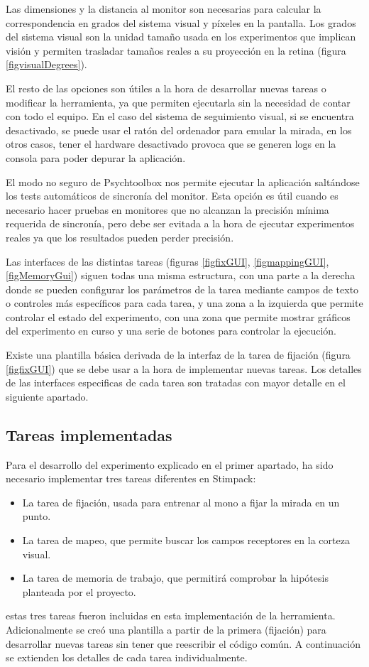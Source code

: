 \documentclass[conference]{IEEEtran}
\begin{document}
Las dimensiones y la distancia al monitor son necesarias para calcular la correspondencia en grados del sistema visual y píxeles en la pantalla. Los grados del sistema visual son la unidad tamaño usada en los experimentos que implican visión y permiten trasladar tamaños reales a su proyección en la retina (figura \ref{figvisualDegrees}).

El resto de las opciones son útiles a la hora de desarrollar nuevas tareas o modificar la herramienta, ya que permiten ejecutarla sin la necesidad de contar con todo el equipo. En el caso del sistema de seguimiento visual, si se encuentra desactivado, se puede usar el ratón del ordenador para emular la mirada, en los otros casos, tener el hardware desactivado provoca que se generen logs en la consola para poder depurar la aplicación.

El modo no seguro de Psychtoolbox nos permite ejecutar la aplicación saltándose los tests automáticos de sincronía del monitor. Esta opción es útil cuando es necesario hacer pruebas en monitores que no alcanzan la precisión mínima requerida de sincronía, pero debe ser evitada a la hora de ejecutar experimentos reales ya que los resultados pueden perder precisión.

Las interfaces de las distintas tareas (figuras \ref{figfixGUI}, \ref{figmappingGUI}, \ref{figMemoryGui}) siguen todas una misma estructura, con una parte a la derecha donde se pueden configurar los parámetros de la tarea mediante campos de texto o controles más específicos para cada tarea, y una zona a la izquierda que permite controlar el estado del experimento, con una zona que permite mostrar gráficos del experimento en curso y una serie de botones para controlar la ejecución.

Existe una plantilla básica derivada de la interfaz de la tarea de fijación (figura \ref{figfixGUI}) que se debe usar a la hora de implementar nuevas tareas.
Los detalles de las interfaces especificas de cada tarea son tratadas con mayor detalle en el siguiente apartado.

\subsection{Tareas implementadas}

Para el desarrollo del experimento explicado en el primer apartado, ha sido necesario implementar tres tareas diferentes en Stimpack:
\begin{itemize}
	\item La tarea de fijación, usada para entrenar al mono a fijar la mirada en un punto.
	\item La tarea de mapeo, que permite buscar los campos receptores en la corteza visual. 
	\item La tarea de memoria de trabajo, que permitirá comprobar la hipótesis planteada por el proyecto.
\end{itemize}
estas tres tareas fueron incluidas en esta implementación de la herramienta. Adicionalmente se creó una plantilla a partir de la primera (fijación) para desarrollar nuevas tareas sin tener que reescribir el código común. 
A continuación se extienden los detalles de cada tarea individualmente.
\end{document}
